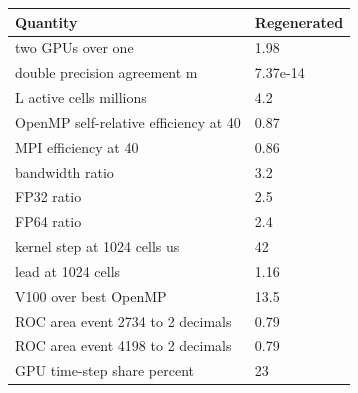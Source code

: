 \begin{tabular}{ll}
Quantity & Regenerated \\
\hline
two GPUs over one & 1.98 \\
double precision agreement m & 7.37e-14 \\
L active cells millions & 4.2 \\
OpenMP self-relative efficiency at 40 & 0.87 \\
MPI efficiency at 40 & 0.86 \\
bandwidth ratio & 3.2 \\
FP32 ratio & 2.5 \\
FP64 ratio & 2.4 \\
kernel step at 1024 cells us & 42 \\
lead at 1024 cells & 1.16 \\
V100 over best OpenMP & 13.5 \\
ROC area event 2734 to 2 decimals & 0.79 \\
ROC area event 4198 to 2 decimals & 0.79 \\
GPU time-step share percent & 23 \\
\end{tabular}
